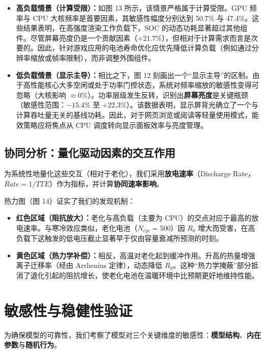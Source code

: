 \documentclass[11pt,a4paper]{ctexart}
\begin{document}
\begin{itemize}[leftmargin=1.6em,itemsep=0.3em]
\item \textbf{高负载情景（计算受限）：}如图 13 所示，该情景严格属于计算受限。GPU 频率与 CPU 大核频率是首要因素，其敏感性幅度分别达到 50.7\% 与 47.4\%。这些结果表明，在高强度渲染工作负载下，SOC 的动态功耗显著超过其他组件。尽管屏幕亮度仍是一个贡献因素（$+21.7\%$），但相对于计算需求而言是次要的。因此，针对游戏应用的电池寿命优化应优先降低计算负载（例如通过分辨率缩放或帧率限制），而非调整外围组件。
\item \textbf{低负载情景（显示主导）：}相比之下，图 12 刻画出一个“显示主导”的区制。由于高性能核心大多空闲或处于功率门控状态，系统对频率缩放的敏感性变得可忽略（大核影响 $\approx 0\%$）。功率层级发生反转，识别出\textbf{屏幕亮度}是关键瓶颈（敏感性范围：$-15.4\%$ 至 $+22.3\%$）。该数据表明，显示屏背光确立了一个与计算吞吐量无关的基线功耗。因此，对于网页浏览或阅读等轻量使用模式，能效策略应将焦点从 CPU 调度转向显示面板效率与亮度管理。
\end{itemize}

\subsection{协同分析：量化驱动因素的交互作用}

为系统性地量化这些交互（相对于老化），我们采用\textbf{放电速率}（Discharge Rate，$Rate=1/TTE$）作为指标，并计算\textbf{协同速率影响}。

热力图（图 14）证实了我们的发现机制：

\begin{itemize}[leftmargin=1.6em,itemsep=0.3em]
\item \textbf{红色区域（阻抗放大）：}老化与高负载（主要为 CPU）的交点对应于最高的放电速率。与寒冷效应类似，老化电池（$N_{cyc}=500$）因 $R_0$ 增大而受害，在高负载下这触发的低电压截止显著早于仅由容量衰减所预测的时刻。
\item \textbf{黄色区域（热力学补偿）：}相反，高温对老化起到缓冲作用。升高的热量增强离子迁移率（经由 Arrhenius 定律），动态降低 $R_0$。这种“热力学掩蔽”部分抵消了退化引起的阻抗增长，使老化电池在温暖环境中比预期更好地维持性能。
\end{itemize}
\section{敏感性与稳健性验证}

为确保模型的可靠性，我们考察了模型对三个关键维度的敏感性：\textbf{模型结构}、\textbf{内在参数}与\textbf{随机行为}。
\end{document}
